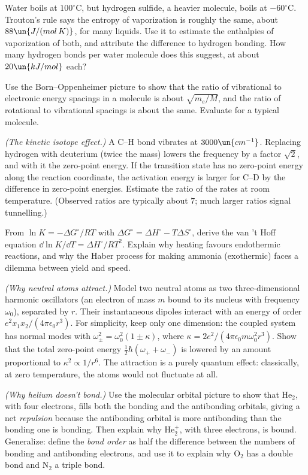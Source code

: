 \begin{problems}
 Water boils at $100^\circ\text{C}$, but hydrogen sulfide, a heavier molecule, boils at $-60^\circ\text{C}$. Trouton's rule says the entropy of vaporization is roughly the same, about $88\un{J/(mol\,K)}$, for many liquids. Use it to estimate the enthalpies of vaporization of both, and attribute the difference to hydrogen bonding. How many hydrogen bonds per water molecule does this suggest, at about $20\un{kJ/mol}$ each?

 Use the Born--Oppenheimer picture to show that the ratio of vibrational to electronic energy spacings in a molecule is about $\sqrt{m_e/M}$, and the ratio of rotational to vibrational spacings is about the same. Evaluate for a typical molecule.

 \label{prob:kie} \emph{(The kinetic isotope effect.)} A C--H bond vibrates at $3000\un{cm^{-1}}$. Replacing hydrogen with deuterium (twice the mass) lowers the frequency by a factor $\sqrt2$, and with it the zero-point energy. If the transition state has no zero-point energy along the reaction coordinate, the activation energy is larger for C--D by the difference in zero-point energies. Estimate the ratio of the rates at room temperature. (Observed ratios are typically about $7$; much larger ratios signal tunnelling.)

 \label{prob:vant-hoff} From $\ln K = -\Delta G^\circ/RT$ with $\Delta G^\circ = \Delta H^\circ - T\Delta S^\circ$, derive the van 't Hoff equation $\dd\ln K/\dd T = \Delta H^\circ/RT^2$. Explain why heating favours endothermic reactions, and why the Haber process for making ammonia (exothermic) faces a dilemma between yield and speed.

\core \label{prob:london} \emph{(Why neutral atoms attract.)} Model two neutral atoms as two three-dimensional harmonic oscillators (an electron of mass $m$ bound to its nucleus with frequency $\omega_0$), separated by $r$. Their instantaneous dipoles interact with an energy of order $e^2x_1x_2/(4\pi\epsilon_0r^3)$. For simplicity, keep only one dimension: the coupled system has normal modes with $\omega_\pm^2 = \omega_0^2(1\pm\kappa)$, where $\kappa = 2e^2/(4\pi\epsilon_0 m\omega_0^2 r^3)$. Show that the total zero-point energy $\tfrac12\hbar(\omega_++\omega_-)$ is lowered by an amount proportional to $\kappa^2\propto1/r^6$. The attraction is a purely quantum effect: classically, at zero temperature, the atoms would not fluctuate at all.

 \emph{(Why helium doesn't bond.)} Use the molecular orbital picture to show that He$_2$, with four electrons, fills both the bonding and the antibonding orbitals, giving a net \emph{repulsion} because the antibonding orbital is more antibonding than the bonding one is bonding. Then explain why He$_2^+$, with three electrons, is bound. Generalize: define the \emph{bond order} as half the difference between the numbers of bonding and antibonding electrons, and use it to explain why O$_2$ has a double bond and N$_2$ a triple bond.
\end{problems}

